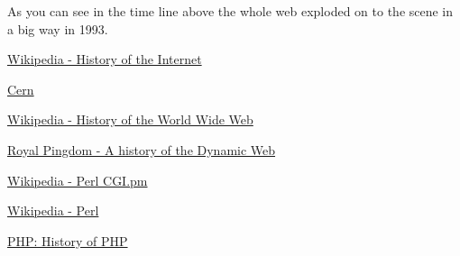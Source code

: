 \documentclass{book}
\begin{document}
As you can see in the time line above the whole web exploded on to the scene in a big way in 1993.


\begin{thebibliography}{56}
\href{http://en.wikipedia.org/wiki/History_of_the_Internet}{Wikipedia - History of the Internet}

\href{http://info.cern.ch/}{Cern}

\href{http://en.wikipedia.org/wiki/History_of_the_World_Wide_Web}{Wikipedia - History of the World Wide Web}

\href{http://royal.pingdom.com/2007/12/07/a-history-of-the-dynamic-web/}{Royal Pingdom - A history of the Dynamic Web}

\href{http://en.wikipedia.org/wiki/CGI.pm}{Wikipedia - Perl CGI.pm}

\href{http://en.wikipedia.org/wiki/Perl}{Wikipedia - Perl}

\href{http://nz1.php.net/manual/en/history.php.php}{PHP: History of PHP}
\end{thebibliography}
\end{document}
